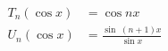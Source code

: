 \begin{equation}
 \begin{split}
 T_n(\cos x) &= \cos nx \\
 U_n(\cos x) &= \frac{\sin \; (n+1)x }{\sin x}
 \end{split}
\end{equation}

